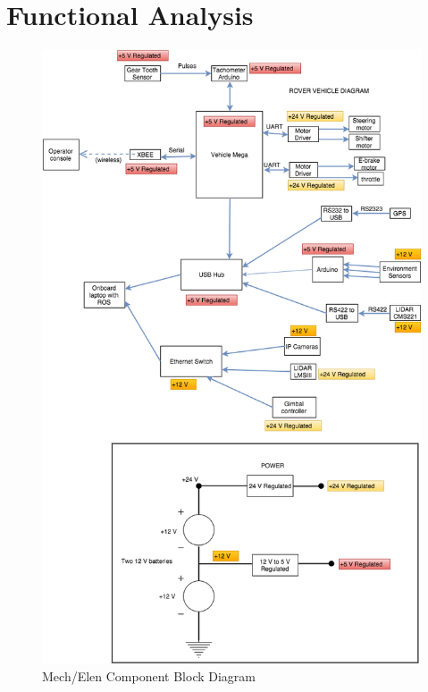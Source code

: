 \section{Functional Analysis}
\begin{figure}[H]
\centering
\includegraphics[scale=0.5]{Mech-elen_Component_Block_Diagram}
\caption{Mech/Elen Component Block Diagram}
\label{fig:mechelencomponentdiagram}
\end{figure}


